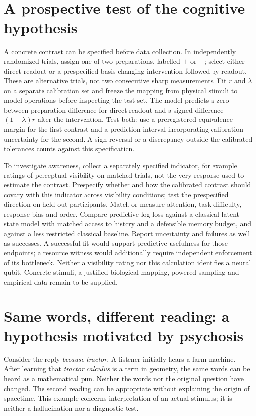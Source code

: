 \documentclass[11pt,a4paper]{article}
\theoremstyle{definition}
\begin{document}
\section{A prospective test of the cognitive hypothesis}
A concrete contrast can be specified before data collection. In independently randomized trials, assign one of two preparations, labelled $+$ or $-$; select either direct readout or a prespecified basis-changing intervention followed by readout. These are alternative trials, not two consecutive sharp measurements. Fit $r$ and $\lambda$ on a separate calibration set and freeze the mapping from physical stimuli to model operations before inspecting the test set. The model predicts a zero between-preparation difference for direct readout and a signed difference $(1-\lambda)r$ after the intervention. Test both: use a preregistered equivalence margin for the first contrast and a prediction interval incorporating calibration uncertainty for the second. A sign reversal or a discrepancy outside the calibrated tolerances counts against this specification.

To investigate awareness, collect a separately specified indicator, for example ratings of perceptual visibility on matched trials, not the very response used to estimate the contrast. Prespecify whether and how the calibrated contrast should covary with this indicator across visibility conditions; test the prespecified direction on held-out participants. Match or measure attention, task difficulty, response bias and order. Compare predictive log loss against a classical latent-state model with matched access to history and a defensible memory budget, and against a less restricted classical baseline. Report uncertainty and failures as well as successes. A successful fit would support predictive usefulness for those endpoints; a resource witness would additionally require independent enforcement of its bottleneck. Neither a visibility rating nor this calculation identifies a neural qubit. Concrete stimuli, a justified biological mapping, powered sampling and empirical data remain to be supplied.

\section{Same words, different reading: a hypothesis motivated by psychosis}
Consider the reply \emph{because tractor}. A listener initially hears a farm machine. After learning that \emph{tractor calculus} is a term in geometry, the same words can be heard as a mathematical pun. Neither the words nor the original question have changed. The second reading can be appropriate without explaining the origin of spacetime. This example concerns interpretation of an actual stimulus; it is neither a hallucination nor a diagnostic test.
\end{document}
